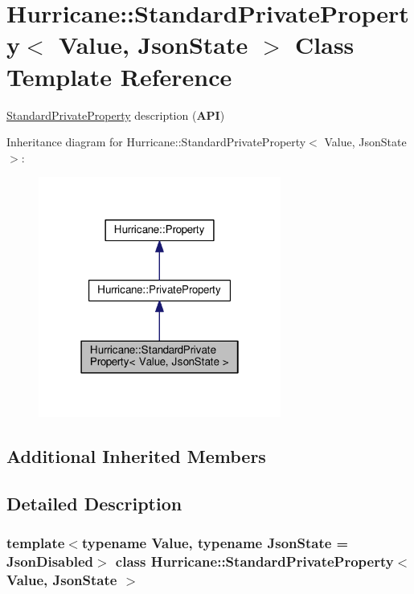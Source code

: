 \hypertarget{classHurricane_1_1StandardPrivateProperty}{}\section{Hurricane\+:\+:Standard\+Private\+Property$<$ Value, Json\+State $>$ Class Template Reference}
\label{classHurricane_1_1StandardPrivateProperty}


\mbox{\hyperlink{classHurricane_1_1StandardPrivateProperty}{Standard\+Private\+Property}} description ({\bfseries A\+PI})  




Inheritance diagram for Hurricane\+:\+:Standard\+Private\+Property$<$ Value, Json\+State $>$\+:\nopagebreak
\begin{figure}[H]
\begin{center}
\leavevmode
\includegraphics[width=226pt]{classHurricane_1_1StandardPrivateProperty__inherit__graph}
\end{center}
\end{figure}
\subsection*{Additional Inherited Members}


\subsection{Detailed Description}
\subsubsection*{template$<$typename Value, typename Json\+State = Json\+Disabled$>$\newline
class Hurricane\+::\+Standard\+Private\+Property$<$ Value, Json\+State $>$}

